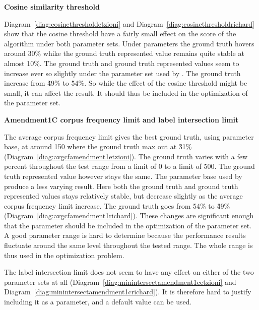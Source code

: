 \textbf{Cosine similarity threshold}

Diagram~\ref{diag:cosinethresholdetzioni} and Diagram~\ref{diag:cosinethresholdrichard} show that the cosine threshold have a fairly small effect on the score of the algorithm under both parameter sets. Under \citeauthor{Oren1998} parameters the ground truth hovers around 30\% whike the ground truth represented value remains quite stable at almost 10\%. The ground truth and ground truth represented values seem to increase ever so slightly under the parameter set used by \supervisor. The ground truth increase from \~ 49\% to \~ 54\%. So while the effect of the cosine threshold might be small, it can affect the result. It should thus be included in the optimization of the parameter set.


\textbf{Amendment1C corpus frequency limit and label intersection limit}

The average corpus frequency limit gives the best ground truth, using \citeauthor{Oren1998} parameter base, at around 150 where the ground truth max out at \~31\% (Diagram~\ref{diag:avgcfamendment1etzioni}). The ground truth varies with a few percent throughout the test range from a limit of 0 to a limit of 500. The ground truth represented value however stays the same. The parameter base used by \supervisor produce a less varying result. Here both the ground truth and ground truth represented values stays relatively stable, but decrease slightly as the average corpus frequency limit increase. The ground truth goes from 54\% to \~49\% (Diagram~\ref{diag:avgcfamendment1richard}). These changes are significant enough that the parameter should be included in the optimization of the parameter set. A good parameter range is hard to determine because the performance results fluctuate around the same level throughout the tested range. The whole range is thus used in the optimization problem.

The label intersection limit does not seem to have any effect on either of the two parameter sets at all (Diagram~\ref{diag:minintersectamendment1cetzioni} and Diagram~\ref{diag:minintersectamendment1crichard}). It is therefore hard to justify including it as a parameter, and a default value can be used.


